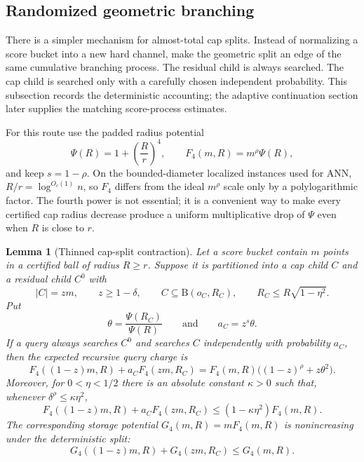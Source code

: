 \documentclass[10pt]{article}
\newtheorem{lemma}[theorem]{Lemma}
\theoremstyle{definition}
\newcommand{\Ball}{\mathrm{B}}
\begin{document}
\subsection{Randomized geometric branching}

There is a simpler mechanism for almost-total cap splits. Instead of normalizing a score bucket into a new hard channel, make the geometric split an edge of the same cumulative branching process. The residual child is always searched. The cap child is searched only with a carefully chosen independent probability. This subsection records the deterministic accounting; the adaptive continuation section later supplies the matching score-process estimates.

For this route use the padded radius potential
\[
   \Psi(R)=1+\left(\frac Rr\right)^4,
   \qquad
   F_4(m,R)=m^\rho\Psi(R),
\]
and keep $s=1-\rho$. On the bounded-diameter localized instances used for ANN, $R/r=\log^{O_c(1)}n$, so $F_4$ differs from the ideal $m^\rho$ scale only by a polylogarithmic factor. The fourth power is not essential; it is a convenient way to make every certified cap radius decrease produce a uniform multiplicative drop of $\Psi$ even when $R$ is close to $r$.

\begin{lemma}[Thinned cap-split contraction]\label{lem:thin-cap-contraction}
   Let a score bucket contain $m$ points in a certified ball of radius $R\ge r$. Suppose it is partitioned into a cap child $C$ and a residual child $C^0$ with
   \[
      |C|=zm,
      \qquad
      z\ge1-\delta,
      \qquad
      C\subseteq\Ball(o_C,R_C),
      \qquad
      R_C\le R\sqrt{1-\eta^2}.
   \]
   Put
   \[
      \theta=\frac{\Psi(R_C)}{\Psi(R)}
      \qquad\text{and}\qquad
      a_C=z^s\theta .
   \]
   If a query always searches $C^0$ and searches $C$ independently with probability $a_C$, then the expected recursive query charge is
   \[
      F_4((1-z)m,R)+a_CF_4(zm,R_C)
      =
      F_4(m,R)\bigl((1-z)^\rho+z\theta^2\bigr).
   \]
   Moreover, for $0<\eta<1/2$ there is an absolute constant $\kappa>0$ such that, whenever $\delta^\rho\le\kappa\eta^2$,
   \[
      F_4((1-z)m,R)+a_CF_4(zm,R_C)
      \le
      (1-\kappa\eta^2)F_4(m,R).
   \]
   The corresponding storage potential $G_4(m,R)=mF_4(m,R)$ is nonincreasing under the deterministic split:
   \[
      G_4((1-z)m,R)+G_4(zm,R_C)\le G_4(m,R).
   \]
\end{lemma}
\end{document}
